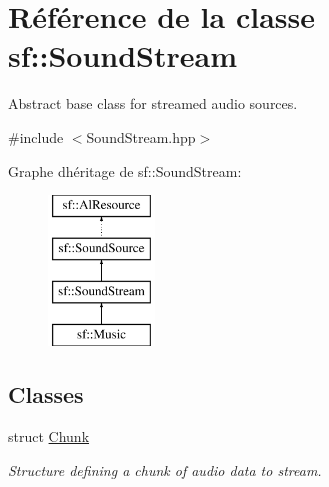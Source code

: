 \hypertarget{classsf_1_1SoundStream}{}\section{Référence de la classe sf\+:\+:Sound\+Stream}
\label{classsf_1_1SoundStream}


Abstract base class for streamed audio sources.  




{\ttfamily \#include $<$Sound\+Stream.\+hpp$>$}

Graphe d\textquotesingle{}héritage de sf\+:\+:Sound\+Stream\+:\begin{figure}[H]
\begin{center}
\leavevmode
\includegraphics[height=4.000000cm]{classsf_1_1SoundStream}
\end{center}
\end{figure}
\subsection*{Classes}
\begin{DoxyCompactItemize}
\item 
struct \hyperlink{structsf_1_1SoundStream_1_1Chunk}{Chunk}
\begin{DoxyCompactList}\small\item\em Structure defining a chunk of audio data to stream. \end{DoxyCompactList}\end{DoxyCompactItemize}
